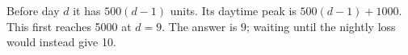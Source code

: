 Before day $d$ it has $500(d-1)$ units. Its daytime peak is $500(d-1)+1000$. This first reaches 5000 at $d=9$. The answer is $\boxed9$; waiting until the nightly loss would instead give 10.
